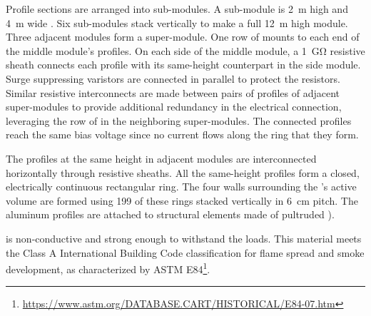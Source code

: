 Profile sections are arranged into  sub-modules.
A  sub-module is \SI{2}{\m} high and \SI{4}{\m} wide .  Six sub-modules stack vertically to make a full \SI{12}{\m} high module. Three adjacent modules form a super-module. One row of  mounts to each end of the middle module's profiles. On each side of the middle module, a \SI{1}{\giga\ohm} resistive sheath connects each profile with its same-height counterpart in the side module. Surge suppressing varistors are connected in parallel to protect the resistors. Similar resistive interconnects are made between pairs of  profiles of adjacent super-modules to provide additional redundancy in the  electrical connection, leveraging the row of  in the neighboring super-modules.  The connected profiles reach the same bias voltage since no current flows along the ring that they form.  

  
The profiles at the same height in adjacent modules are interconnected horizontally through resistive sheaths. All the same-height profiles form a closed, electrically continuous rectangular ring. 
The four walls surrounding the 's active volume are formed using \num{199} of these rings stacked vertically in \SI{6}{\cm} pitch. The aluminum profiles are attached to structural elements made of pultruded ).  

 is non-conductive and strong enough to withstand the  loads. %
This material meets the  Class A International Building Code classification for flame spread and smoke development, as characterized by ASTM E84\footnote{\url{https://www.astm.org/DATABASE.CART/HISTORICAL/E84-07.htm}}. 

